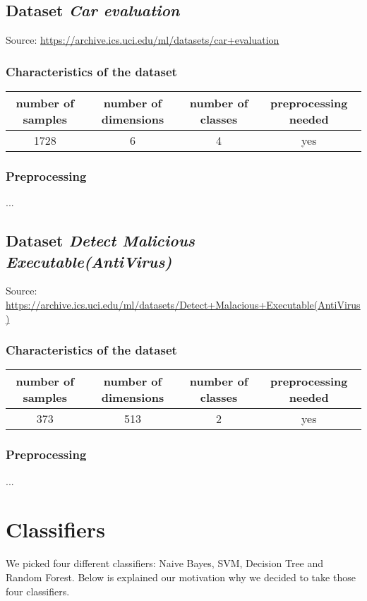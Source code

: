 \documentclass[11pt,a4paper,titlepage]{article}
\begin{document}
\subsection{Dataset \textit{Car evaluation}}
Source: \url{https://archive.ics.uci.edu/ml/datasets/car+evaluation}
\subsubsection{Characteristics of the dataset}
\begin{center}
  \begin{tabular}{| c | c | c | c |}
    \hline
    number of samples & number of dimensions & number of classes & preprocessing needed \\ \hline
    1728 & 6 & 4 & yes \\
    \hline
  \end{tabular}
\end{center}
\subsubsection{Preprocessing}
...

\subsection{Dataset \textit{Detect Malicious Executable(AntiVirus)}}
Source: \url{https://archive.ics.uci.edu/ml/datasets/Detect+Malacious+Executable(AntiVirus)}
\subsubsection{Characteristics of the dataset}
\begin{center}
  \begin{tabular}{| c | c | c | c |}
    \hline
    number of samples & number of dimensions & number of classes & preprocessing needed \\ \hline
    373 & 513 & 2 & yes \\
    \hline
  \end{tabular}
\end{center}
\subsubsection{Preprocessing}
...


\section{Classifiers}
We picked four different classifiers: Naive Bayes, SVM, Decision Tree and Random Forest. Below is explained our motivation why we decided to take those four classifiers.
\end{document}
